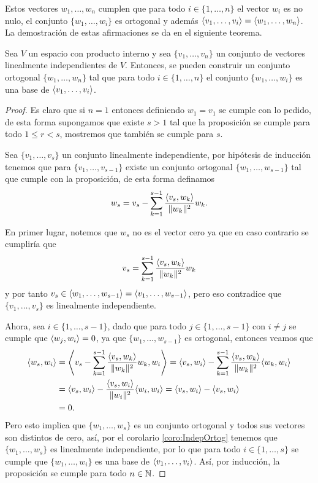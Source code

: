 Estos vectores $w_1,\ldots,w_n$ cumplen que para todo $i \in \{1,\ldots,n\}$ el vector $w_i$ es no nulo, el conjunto $\{w_1,\ldots,w_i\}$ es ortogonal y además $\langle v_1,\ldots,v_i\rangle = \langle w_1,\ldots,w_n\rangle$. La demostración de estas afirmaciones se da en el siguiente teorema.

\begin{teor}
  Sea $V$ un espacio con producto interno y sea $\{v_1,\ldots,v_n\}$ un conjunto de vectores linealmente independientes de $V$. Entonces, se pueden construir un conjunto ortogonal $\{w_1,\ldots,w_n\}$ tal que para todo $i \in \{1,\ldots,n\}$ el conjunto $\{w_1,\ldots,w_i\}$ es una base de $\langle v_1,\ldots,v_i\rangle$.
\end{teor}
\begin{proof}
  Es claro que si $n=1$ entonces definiendo $w_1 = v_1$ se cumple con lo pedido, de esta forma supongamos que existe $s>1$ tal que la proposición se cumple para todo $1 \leq r < s$, mostremos que también se cumple para $s$.

  Sea $\{v_1,\ldots,v_s\}$ un conjunto linealmente independiente,  por hipótesis de inducción tenemos que para $\{v_1,\ldots,v_{s-1}\}$ existe un conjunto ortogonal $\{w_1,\ldots,w_{s-1}\}$ tal que cumple con la proposición, de esta forma definamos
    \[
      w_s = v_s - \sum_{k=1}^{s-1} \frac{\langle v_s,w_k\rangle}{\mathopen\|w_k\mathclose\|^2} w_k.
    \]
  
  En primer lugar, notemos que $w_s$ no es el vector cero ya que en caso contrario se cumpliría que
    \[
      v_s = \sum_{k=1}^{s-1} \frac{\langle v_s,w_k\rangle}{\mathopen\|w_k\mathclose\|^2} w_k
    \]
  y por tanto $v_s \in \langle w_1,\ldots,w_{s-1}\rangle=\langle v_1,\ldots,w_{v-1}\rangle$, pero eso contradice que $\{v_1,\ldots,v_s\}$ es linealmente independiente.

  Ahora, sea $i \in \{1,\ldots,s-1\}$, dado que para todo $j \in  \{1,\ldots,s-1\}$ con $i \neq j$ se cumple que $\langle w_j,w_i\rangle = 0$, ya que $\{w_1,\ldots,w_{s-1}\}$ es ortogonal, entonces veamos que
    \begin{align*}
      \inner{w_s, w_i}
        &= \Inner{v_s - \sum_{k=1}^{s-1} \frac{\inner{v_s,w_k}}{\norm{w_k}^2} w_k, w_i} 
        = \inner{v_s,w_i} - \sum_{k=1}^{s-1} \frac{\inner{v_s,w_k}}{\norm{w_k}^2} \inner{w_k, w_i} \\
        &= \inner{v_s,w_i} - \frac{\inner{v_s,w_i}}{\norm{w_i}^2} \inner{w_i, w_i} 
        = \inner{v_s,w_i} - \inner{v_s,w_i} \\
        &= 0.
    \end{align*}
  Pero esto implica que $\{w_1,\ldots,w_s\}$ es un conjunto ortogonal y todos sus vectores son distintos de cero, así, por el corolario \ref{coro:IndepOrtog} tenemos que $\{w_1,\ldots,w_s\}$ es linealmente independiente, por lo que para todo $i \in \{1,\ldots,s\}$ se cumple que $\{w_1,\ldots,w_i\}$ es una base de $\langle v_1,\ldots,v_i\rangle$. Así, por inducción, la proposición se cumple para todo $n \in \mathbb{N}$.
\end{proof}

